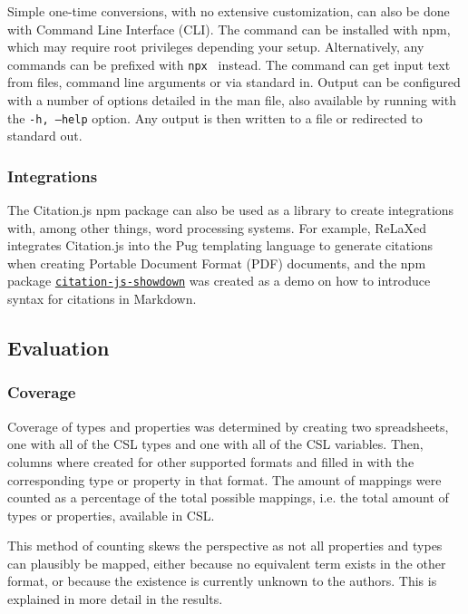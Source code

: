 \documentclass[fleqn,10pt,lineno]{wlpeerj} %
\begin{document}
Simple one-time conversions, with no extensive customization, can also be done with Command Line Interface (CLI). The command can be installed with npm, which may require root privileges depending your setup. Alternatively, any commands can be prefixed with \texttt{npx } instead. The command can get input text from files, command line arguments or via standard in. Output can be configured with a number of options detailed in the man file, also available by running with the \texttt{-h, --help} option. Any output is then written to a file or redirected to standard out.

\subsubsection*{Integrations}

The Citation.js npm package can also be used as a library to create integrations with, among other things, word processing systems. For example, ReLaXed \citep{null2018RelaxedJS/ReLaXed} integrates Citation.js into the Pug templating language to generate citations when creating Portable Document Format (PDF) documents, and the npm package \href{https://npm.im/citation-js-showdown}{\texttt{citation-js-showdown}} was created as a demo on how to introduce syntax for citations in Markdown.

\subsection*{Evaluation}

\subsubsection*{Coverage}

Coverage of types and properties was determined by creating two spreadsheets, one with all of the CSL types and one with all of the CSL variables. Then, columns where created for other supported formats and filled in with the corresponding type or property in that format. The amount of mappings were counted as a percentage of the total possible mappings, i.e. the total amount of types or properties, available in CSL.

This method of counting skews the perspective as not all properties and types can plausibly be mapped, either because no equivalent term exists in the other format, or because the existence is currently unknown to the authors. This is explained in more detail in the results.
\end{document}
